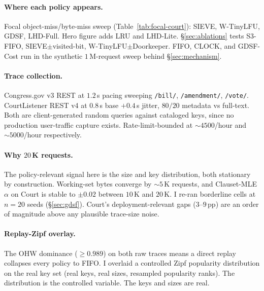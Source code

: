 \documentclass[letterpaper,twocolumn,10pt]{article}
\begin{document}
\paragraph{Where each policy appears.} Focal object-miss/byte-miss sweep
(Table~\ref{tab:focal-court}): SIEVE, W-TinyLFU, GDSF, LHD-Full.
Hero figure adds LRU and LHD-Lite. \S\ref{sec:ablations} tests
S3-FIFO, SIEVE$\pm$visited-bit, W-TinyLFU$\pm$Doorkeeper. FIFO,
CLOCK, and GDSF-Cost run in the synthetic $1$\,M-request sweep
behind \S\ref{sec:mechanism}.
\paragraph{Trace collection.} Congress.gov v3 REST at $1.2$\,s
pacing sweeping \texttt{/bill/}, \texttt{/amendment/},
\texttt{/vote/}. CourtListener REST v4 at $0.8$\,s base $+ 0.4$\,s
jitter, $80/20$ metadata vs full-text. Both are client-generated
random queries against cataloged keys, since no production
user-traffic capture exists. Rate-limit-bounded at $\sim 4500$/hour
and $\sim 5000$/hour respectively.
\paragraph{Why $20$\,K requests.} The policy-relevant
signal here is the size and key distribution, both stationary by
construction. Working-set bytes converge by $\sim 5$\,K requests,
and Clauset-MLE $\alpha$ on Court is stable to $\pm 0.02$ between
$10$\,K and $20$\,K. I re-ran borderline cells at $n{=}20$ seeds
(\S\ref{sec:gdsf}). Court's deployment-relevant gaps ($3$--$9$\,pp)
are an order of magnitude above any plausible trace-size noise.
\paragraph{Replay-Zipf overlay.} The OHW dominance ($\geq 0.989$)
on both raw traces means a direct replay collapses every policy to
FIFO. I overlaid a controlled Zipf popularity distribution on the
real key set (real keys, real sizes, resampled popularity ranks).
The distribution is the controlled variable. The keys and sizes are
real.
\end{document}
